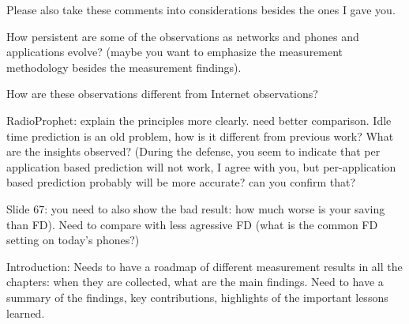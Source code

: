 {Please also take these comments into considerations besides the ones I gave you.

How persistent are some of the observations as networks and phones and applications evolve?  (maybe you want to emphasize the measurement methodology besides the measurement findings).

How are these observations different from Internet observations?

RadioProphet:  explain the principles more clearly.  need better comparison.
Idle time prediction is an old problem, how is it different from previous work?
What are the insights observed?
(During the defense, you seem to indicate that per application based prediction will not work, I agree with you, but per-application based prediction probably will be more accurate?  can you confirm that?

Slide 67: you need to also show the bad result: how much worse is your saving than FD).
Need to compare with less agressive FD (what is the common FD setting on today's phones?)

Introduction:
Needs to have a roadmap of different measurement results in all the chapters: when they are collected, what are the main findings.
Need to have a summary of the findings, key contributions, highlights of the important lessons learned.

}

\label{Abstract}
